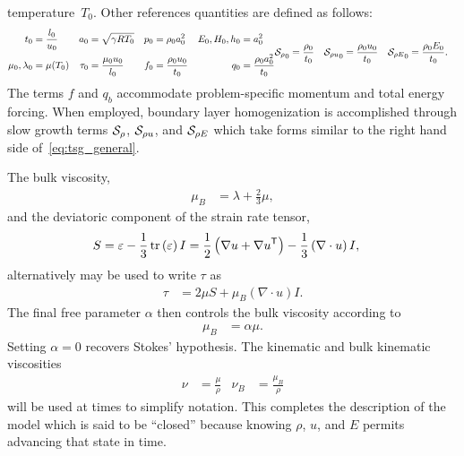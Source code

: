 temperature~$T_{0}$.  Other references quantities are defined as follows:
\begin{subequations}
\label{eq:basic_references}
\begin{align}
  t_{0} &= \frac{l_{0}}{u_{0}}
  &
  a_{0} &= \sqrt{\gamma{}RT_{0}}
  &
  p_{0} &= \rho_{0} a_{0}^{2}
  &
  E_{0}, H_{0}, h_{0} &= a_{0}^{2}
  \\
  \mu_{0},\lambda_{0} &= \mu\!\left( T_{0} \right)
  &
  \tau_{0} &= \frac{\mu_{0}u_{0}}{l_{0}}
  &
  f_{0} &= \frac{\rho_{0}u_{0}}{t_{0}}
  &
  q_{0} &= \frac{\rho_{0}a_{0}^{2}}{t_{0}}
\end{align}
\begin{align}
  {\Ssd_{\rho}}_0 &= \frac{\rho_{0}}{t_0}
  &
  {\Ssd_{\rho u}}_0 &= \frac{\rho_{0} u_0}{t_0}
  &
  {\Ssd_{\rho E}}_0 &= \frac{\rho_{0} E_0}{t_0}.
\end{align}
\end{subequations}
The terms $f$ and $q_b$ accommodate problem-specific momentum and total energy
forcing.  When employed, boundary layer homogenization is accomplished
through slow growth terms $\mathcal{S}_\rho{}$, $\mathcal{S}_{\rho{} u}$, and $\mathcal{S}_{\rho{}
E}$ which take forms similar to the right hand side of~\eqref{eq:tsg_general}.

The bulk viscosity,
\begin{align}
  \mu_{B} &= \lambda + \frac{2}{3}\mu,
\end{align}
and the deviatoric component of the strain rate tensor,
\begin{align}
  S &= \varepsilon - \frac{1}{3} \operatorname{tr}\left(\varepsilon\right) I
     = \frac{1}{2}\left(\nabla{}u + {\nabla{}u}^{\mathsf{T}}\right)
     - \frac{1}{3}\left(\nabla\cdot{}u\right)I,
\end{align}
alternatively may be used to write $\tau$ as
\begin{align}
  \tau &= 2 \mu S + \mu_B  \left( \nabla\cdot{}u \right) I.
\end{align}
The final free parameter $\alpha$ then controls the bulk viscosity according to
\begin{align}
\mu_{B} &= \alpha \mu.
\end{align}
Setting $\alpha=0$ recovers Stokes' hypothesis.  The kinematic and bulk
kinematic viscosities
\begin{align}
 \nu &= \frac{\mu}{\rho} & \nu_{B} &= \frac{\mu_{B}}{\rho}
\end{align}
will be used at times to simplify notation.  This completes the description of
the model which is said to be ``closed'' because knowing $\rho$, $u$, and $E$
permits advancing that state in time.

